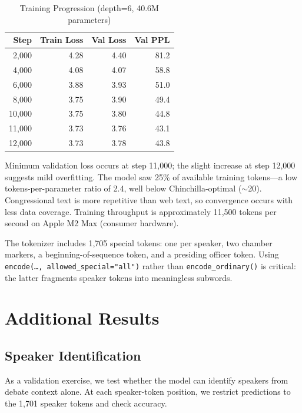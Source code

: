 \documentclass[12pt]{article}
\begin{document}
\begin{table}[H]
\centering
\caption{Training Progression (depth=6, 40.6M parameters)}
\label{tab:training}
\begin{tabular}{rrrr}
\toprule
Step & Train Loss & Val Loss & Val PPL \\
\midrule
2,000 & 4.28 & 4.40 & 81.2 \\
4,000 & 4.08 & 4.07 & 58.8 \\
6,000 & 3.88 & 3.93 & 51.0 \\
8,000 & 3.75 & 3.90 & 49.4 \\
10,000 & 3.75 & 3.80 & 44.8 \\
11,000 & 3.73 & 3.76 & 43.1 \\
12,000 & 3.73 & 3.78 & 43.8 \\
\bottomrule
\end{tabular}
\end{table}

Minimum validation loss occurs at step 11,000; the slight increase at step 12,000 suggests mild overfitting. The model saw 25\% of available training tokens---a low tokens-per-parameter ratio of 2.4, well below Chinchilla-optimal ($\sim$20). Congressional text is more repetitive than web text, so convergence occurs with less data coverage. Training throughput is approximately 11,500 tokens per second on Apple M2 Max (consumer hardware).

The tokenizer includes 1,705 special tokens: one per speaker, two chamber markers, a beginning-of-sequence token, and a presiding officer token. Using \texttt{encode(\ldots, allowed\_special="all")} rather than \texttt{encode\_ordinary()} is critical: the latter fragments speaker tokens into meaningless subwords.


\section{Additional Results}
\label{app:results}

\subsection{Speaker Identification}

As a validation exercise, we test whether the model can identify speakers from debate context alone. At each speaker-token position, we restrict predictions to the 1,701 speaker tokens and check accuracy.
\end{document}
